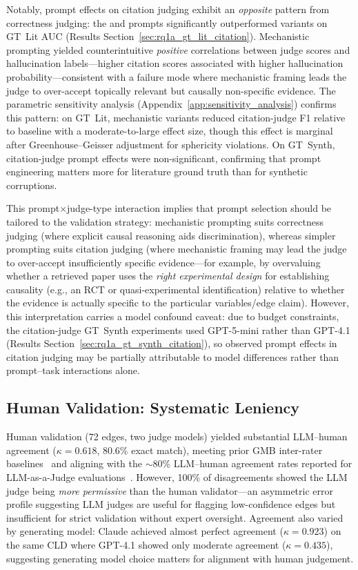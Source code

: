 Notably, prompt effects on citation judging exhibit an \emph{opposite} pattern from correctness judging: the \PromptBaseline{} and \PromptCoT{} prompts significantly outperformed \PromptMechanistic{} variants on GT~Lit AUC (Results Section~\ref{sec:rq1a_gt_lit_citation}). Mechanistic prompting yielded counterintuitive \emph{positive} correlations between judge scores and hallucination labels---higher citation scores associated with higher hallucination probability---consistent with a failure mode where mechanistic framing leads the judge to over-accept topically relevant but causally non-specific evidence. The parametric sensitivity analysis (Appendix~\ref{app:sensitivity_analysis}) confirms this pattern: on GT~Lit, mechanistic variants reduced citation-judge F1 relative to baseline with a moderate-to-large effect size, though this effect is marginal after Greenhouse--Geisser adjustment for sphericity violations. On GT~Synth, citation-judge prompt effects were non-significant, confirming that prompt engineering matters more for literature ground truth than for synthetic corruptions.

This prompt$\times$judge-type interaction implies that prompt selection should be tailored to the validation strategy: mechanistic prompting suits correctness judging (where explicit causal reasoning aids discrimination), whereas simpler prompting suits citation judging (where mechanistic framing may lead the judge to over-accept insufficiently specific evidence---for example, by overvaluing whether a retrieved paper uses the \emph{right experimental design} for establishing causality (e.g., an RCT or quasi-experimental identification) relative to whether the evidence is actually specific to the particular variables/edge claim). However, this interpretation carries a model confound caveat: due to budget constraints, the citation-judge GT~Synth experiments used GPT-5-mini rather than GPT-4.1 (Results Section~\ref{sec:rq1a_gt_synth_citation}), so observed prompt effects in citation judging may be partially attributable to model differences rather than prompt--task interactions alone.

\subsection{Human Validation: Systematic Leniency}
Human validation (72 edges, two judge models) yielded substantial LLM--human agreement ($\kappa = 0.618$, 80.6\% exact match), meeting prior GMB inter-rater baselines~\citep{landis1977measurement} and aligning with the $\sim$80\% LLM--human agreement rates reported for LLM-as-a-Judge evaluations~\citep{zheng2024judging}. However, 100\% of disagreements showed the LLM judge being \emph{more permissive} than the human validator---an asymmetric error profile suggesting LLM judges are useful for flagging low-confidence edges but insufficient for strict validation without expert oversight. Agreement also varied by generating model: Claude achieved almost perfect agreement ($\kappa = 0.923$) on the same CLD where GPT-4.1 showed only moderate agreement ($\kappa = 0.435$), suggesting generating model choice matters for alignment with human judgement.


